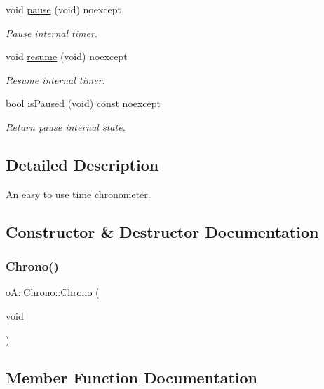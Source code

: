\begin{DoxyCompactItemize}
void \mbox{\hyperlink{classo_a_1_1_chrono_a64646924bdd219e72b58999745928fe6}{pause}} (void) noexcept
\begin{DoxyCompactList}\small\item\em Pause internal timer. \end{DoxyCompactList}\item 
void \mbox{\hyperlink{classo_a_1_1_chrono_a2056863ec3fa0a94ed02fa0393b116e9}{resume}} (void) noexcept
\begin{DoxyCompactList}\small\item\em Resume internal timer. \end{DoxyCompactList}\item 
bool \mbox{\hyperlink{classo_a_1_1_chrono_aeeaed136925a70bd668648b0a99b3f8e}{is\+Paused}} (void) const noexcept
\begin{DoxyCompactList}\small\item\em Return pause internal state. \end{DoxyCompactList}\end{DoxyCompactItemize}


\subsection{Detailed Description}
An easy to use time chronometer. 

\subsection{Constructor \& Destructor Documentation}
\mbox{\label{classo_a_1_1_chrono_aec5a69450af4387e5d1b2b2344dc2bcd}} 
\subsubsection{\texorpdfstring{Chrono()}{Chrono()}}
{\footnotesize\ttfamily o\+A\+::\+Chrono\+::\+Chrono (\begin{DoxyParamCaption}\item[{void}]{ }\end{DoxyParamCaption})\hspace{0.3cm}{\ttfamily [inline]}}



\subsection{Member Function Documentation}
\mbox{\label{classo_a_1_1_chrono_ac5ed210f5be9e507c95940356338bd88}} 
